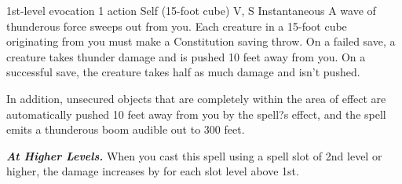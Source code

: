 \documentclass[10pt,twoside,twocolumn,openany]{book}
\newcommand\impact[1]{
	\textbf{\textit{#1}}
}
\begin{document}
{1st-level evocation}
{\color{action} 1 action}
{Self (15-foot cube)}
{V, S}
{Instantaneous}
%
A wave of thunderous force sweeps out from you. Each creature in a 15-foot cube originating from you must make a Constitution saving throw. On a failed save, a creature takes  thunder damage and is pushed 10 feet away from you. On a successful save, the creature takes half as much damage and isn't pushed.

In addition, unsecured objects that are completely within the area of effect are automatically pushed 10 feet away from you by the spell?s effect, and the spell emits a thunderous boom audible out to 300 feet.

\impact{At Higher Levels.} When you cast this spell using a spell slot of 2nd level or higher, the damage increases by  for each slot level above 1st.
\printindex
\printindex[cr]
\end{document}
